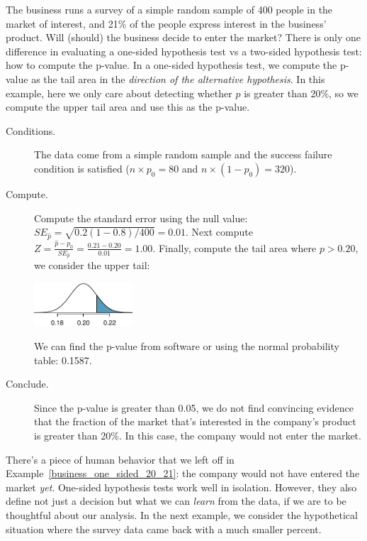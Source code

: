 \begin{example}{The business runs a survey of a simple
    random sample of 400 people in the market of interest,
    and 21\% of the people express interest in the
    business' product. Will (should) the business decide
    to enter the market?}
    \label{business_one_sided_20_21}
  There is only one difference in evaluating a one-sided
  hypothesis test vs a two-sided hypothesis test: how to
  compute the p-value.
  In a one-sided hypothesis test, we compute the p-value as
  the tail area in the \emph{direction of the alternative
  hypothesis}. In this example, here we only care about
  detecting whether $p$ is greater than 20\%, so we compute
  the upper tail area and use this as the p-value.
  \begin{description}
  \item[Conditions.] The data come from a simple random sample
      and the success failure condition is satisfied
      ($n \times p_0 = 80$ and $n \times (1 - p_0) = 320$).
  \item[Compute.] Compute the standard error using the null
      value: $SE_{\hat{p}} = \sqrt{0.2 (1 - 0.8) / 400} = 0.01$.
      Next compute
      $Z = \frac{\hat{p} - p_0}{SE_{\hat{p}}}
         = \frac{0.21 - 0.20}{0.01}
         = 1.00$.
      Finally, compute the tail area where $p > 0.20$,
      we consider the upper tail:
      \begin{center}
      \includegraphics[width=0.3\textwidth]{ch_inference_for_props/figures/business_one_sided_20_21-p_value/business_one_sided_20_21-p_value}
      \end{center}
      We can find the p-value from software or using the
      normal probability table: 0.1587.
  \item[Conclude.] Since the p-value is greater than 0.05,
      we do not find convincing evidence that the fraction
      of the market that's interested in the company's
      product is greater than 20\%. In this case, the
      company would not enter the market.
  \end{description}
\end{example}

There's a piece of human behavior that we left off in
Example~\ref{business_one_sided_20_21}: the company
would not have entered the market \emph{yet}. One-sided
hypothesis tests work well in isolation. However,
they also define not just a decision but what we can
\emph{learn} from the data, if we are to be thoughtful
about our analysis. %
In the next example, we consider the hypothetical
situation where the survey data came back with
a much smaller percent.

